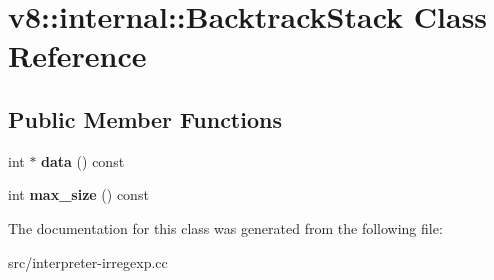 \hypertarget{classv8_1_1internal_1_1_backtrack_stack}{}\section{v8\+:\+:internal\+:\+:Backtrack\+Stack Class Reference}
\label{classv8_1_1internal_1_1_backtrack_stack}
\subsection*{Public Member Functions}
\begin{DoxyCompactItemize}
\item 
\hypertarget{classv8_1_1internal_1_1_backtrack_stack_adf8f617c1064c3a4a1f1a3fe3684be9c}{}int $\ast$ {\bfseries data} () const \label{classv8_1_1internal_1_1_backtrack_stack_adf8f617c1064c3a4a1f1a3fe3684be9c}

\item 
\hypertarget{classv8_1_1internal_1_1_backtrack_stack_ac3e94a3e619d1ce97cfa473354baa469}{}int {\bfseries max\+\_\+size} () const \label{classv8_1_1internal_1_1_backtrack_stack_ac3e94a3e619d1ce97cfa473354baa469}

\end{DoxyCompactItemize}


The documentation for this class was generated from the following file\+:\begin{DoxyCompactItemize}
\item 
src/interpreter-\/irregexp.\+cc\end{DoxyCompactItemize}
